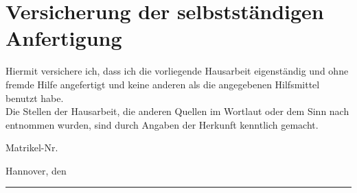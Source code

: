 \documentclass[%
	12pt,%
	paper=a4,
	pagesize,
	oneside,
	draft,%
	ngerman
]{scrreprt}
\begin{document}
\pagestyle{scrheadings}
\clearscrheadfoot 
\ihead{\headmark} 
\ohead[\thepage]{\thepage}






\pagestyle{scrplain}

\titlespacing{\chapter}{0pt}{0em}{0pt}
\part*{Versicherung der selbstständigen Anfertigung}

\setcounter{page}{12} %
\vspace{4em}
Hiermit versichere ich, dass ich die vorliegende Hausarbeit eigenständig und ohne fremde Hilfe angefertigt und keine anderen als die angegebenen Hilfsmittel benutzt habe.
\\

Die Stellen der Hausarbeit, die anderen Quellen im Wortlaut oder dem Sinn nach entnommen wurden, sind durch Angaben der Herkunft kenntlich gemacht.
\vspace{4em}


\makeatletter
Matrikel-Nr.~\textbf{\noindent\@author}
\makeatother

\vspace{3em}

Hannover, den \hspace{1em} \rule{10cm}{0.5pt}
\end{document}
